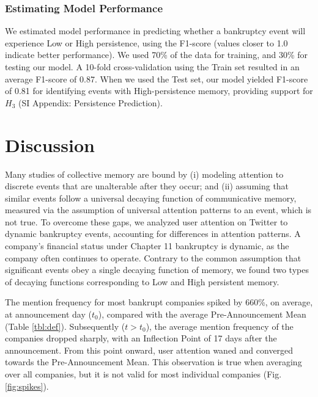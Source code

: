 \documentclass[9pt,twocolumn,twoside,lineno]{pnas-new}
\begin{document}
\subsubsection*{Estimating Model Performance}
We estimated model performance in predicting whether a bankruptcy event will experience Low or High persistence, using the F1-score (values closer to 1.0 indicate better performance).
We used 70\% of the data for training, and 30\% for testing our model.
A 10-fold cross-validation using the Train set resulted in an average F1-score of 0.87.
When we used the Test set, our model yielded F1-score of 0.81 for identifying events with High-persistence memory, providing support for $H_3$ (SI Appendix: Persistence Prediction).


\section*{Discussion}
\label{sec:discussion}
Many studies of collective memory are bound by 
(i) modeling attention to discrete events that are unalterable after they occur; and
(ii) assuming that similar events follow a universal decaying function of communicative memory, measured via the assumption of universal attention patterns to an event, which is not true.
To overcome these gaps, we analyzed user attention on Twitter to dynamic bankruptcy events, accounting for differences in attention patterns.
A company’s financial status under Chapter 11 bankruptcy is dynamic, as the company often continues to operate.
Contrary to the common assumption that significant events obey a single decaying function of memory, we found two types of decaying functions corresponding to Low and High persistent memory.

The mention frequency for most bankrupt companies spiked by 660\%, on average, at announcement day ($t_0$), compared with the average Pre-Announcement Mean (Table \ref{tbl:def}).
Subsequently ($t>t_0$), the average mention frequency of the companies dropped sharply, with an Inflection Point of 17 days after the announcement.
From this point onward, user attention waned and converged towards the Pre-Announcement Mean.
This observation is true when averaging over all companies, but it is not valid for most individual companies (Fig. \ref{fig:spikes}).
\end{document}
